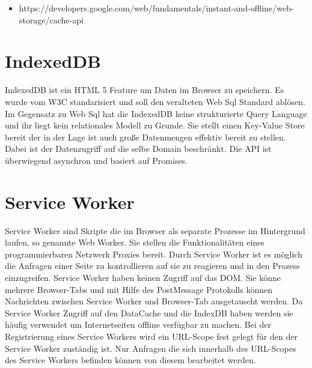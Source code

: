 \begin{itemize}
	\item https://developers.google.com/web/fundamentals/instant-and-offline/web-storage/cache-api
\end{itemize}


\section{IndexedDB}

IndexedDB ist ein HTML 5 Feature um Daten im Browser zu speichern. Es wurde vom W3C standarisiert\cite{w3IndexedDB} und soll den veralteten Web Sql Standard ablösen. Im Gegensatz zu Web Sql hat die IndexedDB keine strukturierte Query Language und ihr liegt kein relationales Modell zu Grunde. Sie stellt einen Key-Value Store bereit der in der Lage ist auch große Datenmengen effektiv bereit zu stellen. Dabei ist der Datenzugriff auf die selbe Domain beschränkt. Die API ist überwiegend asynchron und basiert auf Promises.

\section{Service Worker}
Service Worker sind Skripte die im Browser als separate Prozesse im Hintergrund laufen, so genannte Web Worker. Sie stellen die Funktionalitäten eines programmierbaren Netzwerk Proxies bereit. Durch Service Worker ist es möglich die Anfragen einer Seite zu kontrollieren auf sie zu reagieren und in den Prozess einzugreifen.\cite{w3ServiceWorker} Service Worker haben keinen Zugriff auf das DOM. Sie könne mehrere Browser-Tabs und mit Hilfe des PostMessage Protokolls können Nachrichten zwischen Service Worker und Browser-Tab ausgetauscht werden. Da Service Worker Zugriff auf den DataCache und die IndexDB haben werden sie häufig verwendet um Internetseiten offline verfügbar zu machen. Bei der Registrierung eines Service Workers wird ein URL-Scope fest gelegt für den der Service Worker zuständig ist. Nur Anfragen die sich innerhalb des URL-Scopes des Service Workers befinden können von diesem bearbeitet werden.

